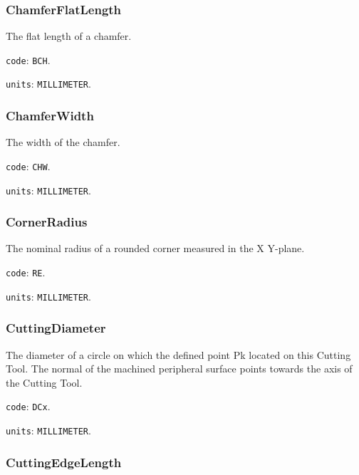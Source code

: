 \FloatBarrier



\subsubsection{ChamferFlatLength}
\label{sec:ChamferFlatLength}



The flat length of a chamfer.


\texttt{code}: \texttt{BCH}.


\texttt{units}: \texttt{MILLIMETER}.



\subsubsection{ChamferWidth}
\label{sec:ChamferWidth}



The width of the chamfer.


\texttt{code}: \texttt{CHW}.


\texttt{units}: \texttt{MILLIMETER}.



\subsubsection{CornerRadius}
\label{sec:CornerRadius}



The nominal radius of a rounded corner measured in the X Y-plane.


\texttt{code}: \texttt{RE}.


\texttt{units}: \texttt{MILLIMETER}.



\subsubsection{CuttingDiameter}
\label{sec:CuttingDiameter}



The diameter of a circle on which the defined point Pk located on this Cutting Tool. The normal of the machined peripheral surface points towards the axis of the Cutting Tool.


\texttt{code}: \texttt{DCx}.


\texttt{units}: \texttt{MILLIMETER}.



\subsubsection{CuttingEdgeLength}
\label{sec:CuttingEdgeLength}




